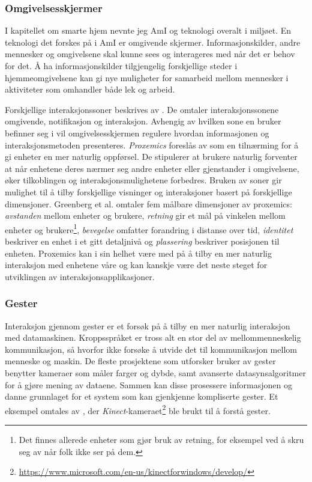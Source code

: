 \subsubsection*{Omgivelsesskjermer}
I kapitellet om smarte hjem nevnte jeg AmI og teknologi overalt i miljøet. En teknologi det forskes på i AmI er omgivende skjermer. Informasjonskilder, andre mennesker og omgivelsene skal kunne sees og interageres med når det er behov for det. Å ha informasjonskilder tilgjengelig forskjellige steder i hjemmeomgivelsene kan gi nye muligheter for samarbeid mellom mennesker i aktiviteter som omhandler både lek og arbeid.

Forskjellige interaksjonssoner beskrives av \citet{streitz05}. De omtaler interaksjonssonene omgivende, notifikasjon og interaksjon. Avhengig av hvilken sone en bruker befinner seg i vil omgivelsesskjermen regulere hvordan informasjonen og interaksjonsmetoden presenteres. \emph{Proxemics} foreslås av \citet{greenberg11} som en tilnærming for å gi enheter en mer naturlig oppførsel. De stipulerer at brukere naturlig forventer at når enhetene deres nærmer seg andre enheter eller gjenstander i omgivelsene, øker tilkoblingen og interaksjonsmulighetene forbedres. Bruken av soner gir mulighet til å tilby forskjellige visninger og interaksjoner basert på forskjellige dimensjoner. Greenberg et al. omtaler fem målbare dimensjoner av proxemics: \emph{avstanden} mellom enheter og brukere, \emph{retning} gir et mål på vinkelen mellom enheter og brukere\footnote{Det finnes allerede enheter som gjør bruk av retning, for eksempel ved å skru seg av når folk ikke ser på dem.}, \emph{bevegelse} omfatter forandring i distanse over tid, \emph{identitet} beskriver en enhet i et gitt detaljnivå og \emph{plassering} beskriver posisjonen til enheten. Proxemics kan i sin helhet være med på å tilby en mer naturlig interaksjon med enhetene våre og kan kanskje være det neste steget for utviklingen av interaksjonsapplikasjoner.\\

\subsubsection*{Gester}
Interaksjon gjennom gester er et forsøk på å tilby en mer naturlig interaksjon med datamaskinen. Kroppsspråket er tross alt en stor del av mellommenneskelig kommunikasjon, så hvorfor ikke forsøke å utvide det til kommunikasjon mellom menneske og maskin. De fleste prosjektene som utforsker bruker av gester benytter kameraer som måler farger og dybde, samt avanserte datasynsalgoritmer for å gjøre mening av dataene. Sammen kan disse prosessere informasjonen og danne grunnlaget for et system som kan gjenkjenne kompliserte gester. Et eksempel omtales av \citet{homeos}, der \emph{Kinect}-kameraet\footnote{\url{https://www.microsoft.com/en-us/kinectforwindows/develop/}} ble brukt til å forstå gester.

